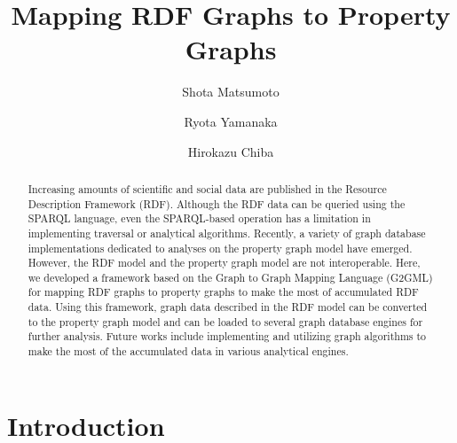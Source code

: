 \documentclass[runningheads]{llncs}
\begin{document}
\newtheorem{defi}{Definition}[section]
%
\title{Mapping RDF Graphs to Property Graphs}
%
%
\author{Shota Matsumoto \and Ryota Yamanaka \and Hirokazu Chiba}
%
%
%
\maketitle              %
%
\begin{abstract}
Increasing amounts of scientific and social data are published in the Resource Description Framework (RDF). Although the RDF data can be queried using the SPARQL language, even the SPARQL-based operation has a limitation in implementing traversal or analytical algorithms.
Recently, a variety of graph database implementations dedicated to analyses on the property graph model have emerged.
However, the RDF model and the property graph model are not interoperable.
Here, we developed a framework based on the Graph to Graph Mapping Language (G2GML) for mapping RDF graphs to property graphs to make the most of accumulated RDF data.
Using this framework, graph data described in the RDF model can be converted to the property graph model and can be loaded to several graph database engines for further analysis. Future works include implementing and utilizing graph algorithms to make the most of the accumulated data in various analytical engines.

\end{abstract}

\section{Introduction}
\end{document}
